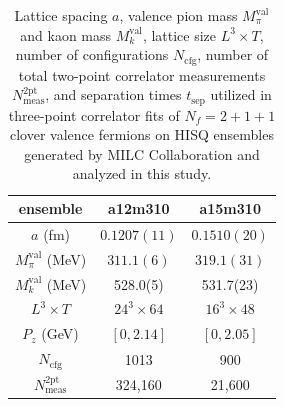 \begin{table}[!htbp]
\centering
\begin{tabular}{|c|c|c|}
\hline
  ensemble &  a12m310 & a15m310 \\
\hline
  $a$ (fm)   & $0.1207(11)$  & $0.1510(20)$ \\
\hline
  $M_\pi^\text{val}$ (MeV)  & $311.1(6)$ & $319.1(31)$\\
\hline
  $M_{k}^\text{val}$ (MeV)  & 528.0(5) &  531.7(23)  \\
\hline
  $L^3\times T$   & $24^3\times 64$ & $16^3\times 48$ \\
\hline
  $P_z$ (GeV)   &  $[0,2.14]$ &  $[0,2.05]$ \\
\hline
  $N_\text{cfg}$  & 1013 & 900 \\
\hline
  $N_\text{meas}^\text{2pt}$   & 324,160 & 21,600 \\
\hline
\end{tabular}
\caption{
Lattice spacing $a$, valence pion mass $M_\pi^\text{val}$ and kaon mass $M_{k}^\text{val}$, lattice size $L^3\times T$, number of configurations $N_\text{cfg}$, number of total two-point correlator measurements $N_\text{meas}^\text{2pt}$, and separation times $t_\text{sep}$ utilized in three-point correlator fits of $N_f=2+1+1$ clover valence fermions on HISQ ensembles generated by MILC Collaboration and analyzed in this study.
}\label{table-data}
\end{table}




